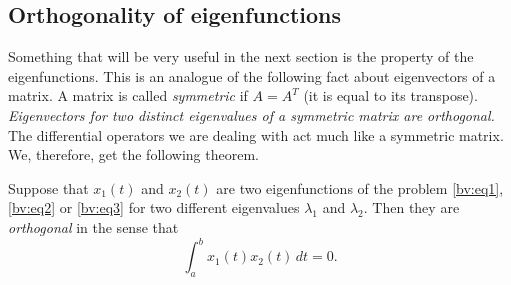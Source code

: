 \subsection{Orthogonality of eigenfunctions}

Something that will be very useful in the next section is the
\emph{} property of the eigenfunctions. This is an analogue
of the following fact about eigenvectors of a matrix.  A matrix is
called
\emph{symmetric}
if $A = A^T$ (it is equal to its transpose).
\emph{Eigenvectors for two distinct eigenvalues of a symmetric
matrix are orthogonal.}
The
differential operators we are dealing with act much like a symmetric matrix.
We, therefore, get the following theorem.

%
%
%

\begin{theorem} \label{bvp:orthogonaleigen}
Suppose that $x_1(t)$ and $x_2(t)$ are two eigenfunctions of the problem
\eqref{bv:eq1}, \eqref{bv:eq2} or \eqref{bv:eq3}
for two different
eigenvalues $\lambda_1$ and $\lambda_2$.  Then they are
\emph{orthogonal}
in the sense that
\begin{equation*}
\int_a^b x_1(t) x_2(t) \,dt = 0 .
\end{equation*}
\end{theorem}

